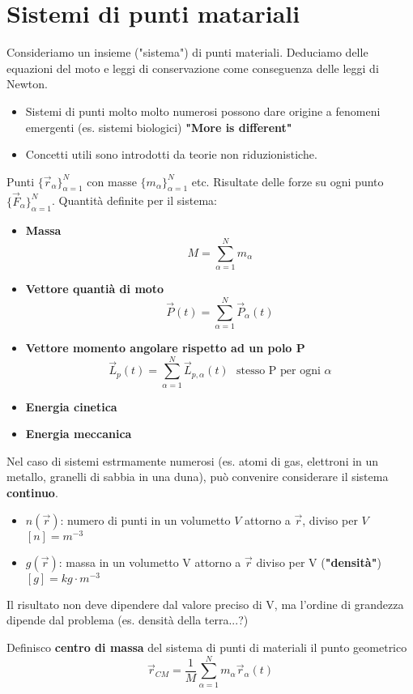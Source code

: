 \newpage
\section{Sistemi di punti matariali}
Consideriamo un insieme ("sistema") di punti materiali. Deduciamo delle equazioni del moto e leggi di conservazione 
come conseguenza delle leggi di Newton.
\begin{itemize}
    \item Sistemi di punti molto molto numerosi possono dare origine a fenomeni emergenti (es. sistemi biologici) \textbf{"More is different"}
    \item Concetti utili sono introdotti da teorie non riduzionistiche.
\end{itemize}
Punti $\{\vec{r}_{\alpha}\}^N_{\alpha=1}$ con masse $\{m_{\alpha}\}^N_{\alpha = 1}$ etc. Risultate delle forze su ogni punto $\{\vec{F}_{\alpha}\}^N_{\alpha = 1}$.
Quantità definite per il sistema:
\begin{itemize}
    \item \textbf{Massa} $$M = \sum_{\alpha = 1}^{N}m_{\alpha}$$
    \item \textbf{Vettore quantià di moto} $$\vec{P}(t) = \sum_{\alpha = 1}^{N} \vec{P}_{\alpha}(t)$$
    \item \textbf{Vettore momento angolare rispetto ad un polo P} $$\vec{L}_p(t) = \sum_{\alpha = 1}^{N}\vec{L}_{p, \alpha}(t) \:\:\: \text{stesso P per ogni }\alpha$$
    \item \textbf{Energia cinetica} %
    \item \textbf{Energia meccanica} %
\end{itemize}
Nel caso di sistemi estrmamente numerosi (es. atomi di gas, elettroni in un metallo, granelli di sabbia in una duna), può convenire
considerare il sistema \textbf{continuo}.
\begin{itemize}
    \item $n(\vec{r})$: numero di punti in un volumetto $V$ attorno a $\vec{r}$, diviso per $V$ $[n] = m^{-3}$
    \item $g(\vec{r})$: massa in un volumetto V attorno a $\vec{r}$ diviso per V (\textbf{"densità"}) $[g] = kg \cdot m^{-3}$
\end{itemize}
\begin{observation}
    Il risultato non deve dipendere dal valore preciso di V, ma l'ordine di grandezza dipende dal problema (es. densità della terra...?)
\end{observation}
\begin{definition}
    Definisco \textbf{centro di massa} del sistema di punti di materiali il punto geometrico 
    $$\vec{r}_{CM} = \frac{1}{M}\sum_{\alpha = 1}^{N} m_{\alpha}\vec{r}_{\alpha}(t)$$
\end{definition}
